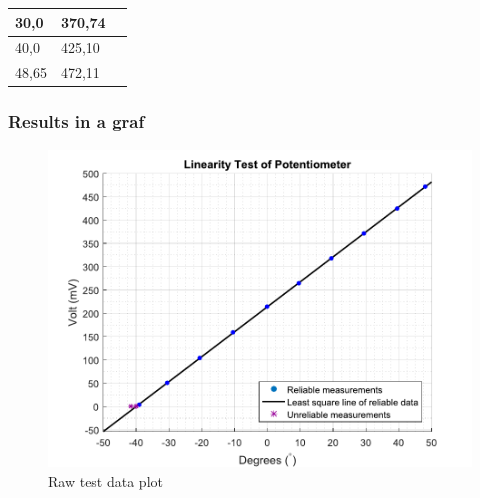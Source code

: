 \begin{table}[H]
\begin{tabular}{|l|l|p{4.3cm}|}
		30,0                              			  & 370,74               \\
		\hline%
		40,0                                          & 425,10               \\
		\hline%
		48,65 										  & 472,11               \\
		\hline%
	\end{tabular}
\end{table}


\subsubsection{Results in a graf}
\begin{figure}[H] 
	\centering 
	\includegraphics[scale=0.7]{figures/linearityOfPotmeterTest2-1}
	\caption{Raw test data plot}
	\label{linearityOfPotmeterTest2-1}
\end{figure}


